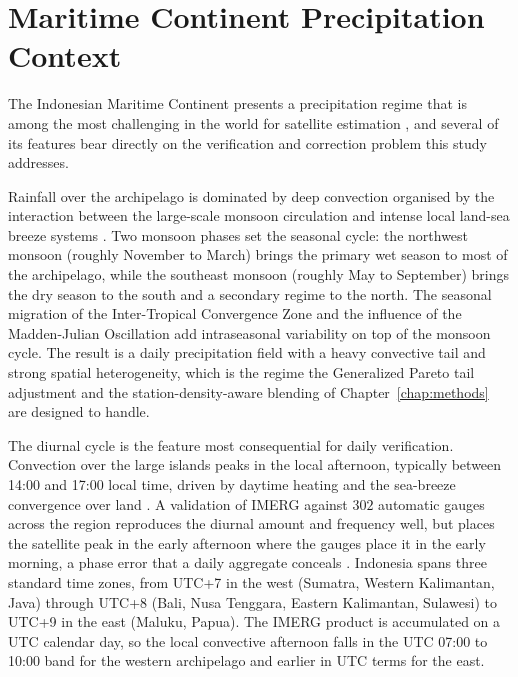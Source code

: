 \section{Maritime Continent Precipitation Context}\label{sec:lit-maritime-continent}

The Indonesian Maritime Continent presents a precipitation
regime that is among the most challenging in the world for
satellite estimation \citep{ref:yamanaka2016}, and several of its
features bear directly on the verification and correction problem
this study addresses.

Rainfall over the archipelago is dominated by deep convection
organised by the interaction between the large-scale monsoon
circulation and intense local land-sea breeze systems
\citep{ref:aldrian2003, ref:wu2008}. Two monsoon phases set the seasonal
cycle: the northwest monsoon (roughly November to March) brings
the primary wet season to most of the archipelago, while the
southeast monsoon (roughly May to September) brings the dry
season to the south and a secondary regime to the north. The
seasonal migration of the Inter-Tropical Convergence Zone and
the influence of the Madden-Julian Oscillation add intraseasonal
variability on top of the monsoon cycle. The result is a daily
precipitation field with a heavy convective tail and strong
spatial heterogeneity, which is the regime the Generalized
Pareto tail adjustment and the station-density-aware blending of
Chapter~\ref{chap:methods} are designed to handle.

The diurnal cycle is the feature most consequential for daily
verification. Convection over the large islands peaks in the
local afternoon, typically between 14:00 and 17:00 local time,
driven by daytime heating and the sea-breeze convergence over
land \citep{ref:mori2004, ref:wu2008}. A validation of IMERG against
$302$ automatic gauges across the region reproduces the diurnal
amount and frequency well, but places the satellite peak in the
early afternoon where the gauges place it in the early morning,
a phase error that a daily aggregate conceals
\citep{ref:ramadhan2024diurnal}. Indonesia spans three standard
time zones, from UTC+7 in the west (Sumatra, Western Kalimantan,
Java) through UTC+8 (Bali, Nusa Tenggara, Eastern Kalimantan,
Sulawesi) to UTC+9 in the east (Maluku, Papua). 
The IMERG product is accumulated on a UTC calendar day,
so the local convective afternoon falls in the UTC 07:00 to
10:00 band for the western archipelago and earlier in UTC terms
for the east.

